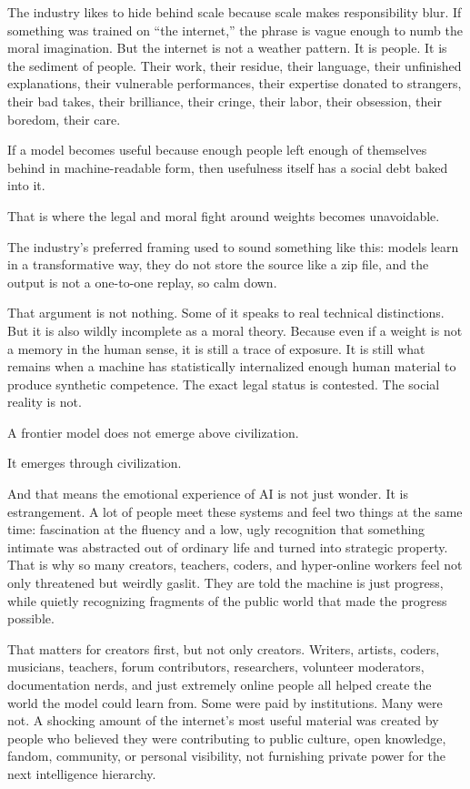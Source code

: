 \documentclass[
  american,
  12pt,
  letterpaper,
]{article}
\begin{document}
The industry likes to hide behind scale because scale makes
responsibility blur. If something was trained on ``the internet,'' the
phrase is vague enough to numb the moral imagination. But the internet
is not a weather pattern. It is people. It is the sediment of people.
Their work, their residue, their language, their unfinished
explanations, their vulnerable performances, their expertise donated to
strangers, their bad takes, their brilliance, their cringe, their labor,
their obsession, their boredom, their care.

If a model becomes useful because enough people left enough of
themselves behind in machine-readable form, then usefulness itself has a
social debt baked into it.

That is where the legal and moral fight around weights becomes
unavoidable.

The industry's preferred framing used to sound something like this:
models learn in a transformative way, they do not store the source like
a zip file, and the output is not a one-to-one replay, so calm down.

That argument is not nothing. Some of it speaks to real technical
distinctions. But it is also wildly incomplete as a moral theory.
Because even if a weight is not a memory in the human sense, it is still
a trace of exposure. It is still what remains when a machine has
statistically internalized enough human material to produce synthetic
competence. The exact legal status is contested. The social reality is
not.

A frontier model does not emerge above civilization.

It emerges through civilization.

And that means the emotional experience of AI is not just wonder. It is
estrangement. A lot of people meet these systems and feel two things at
the same time: fascination at the fluency and a low, ugly recognition
that something intimate was abstracted out of ordinary life and turned
into strategic property. That is why so many creators, teachers, coders,
and hyper-online workers feel not only threatened but weirdly gaslit.
They are told the machine is just progress, while quietly recognizing
fragments of the public world that made the progress possible.

That matters for creators first, but not only creators. Writers,
artists, coders, musicians, teachers, forum contributors, researchers,
volunteer moderators, documentation nerds, and just extremely online
people all helped create the world the model could learn from. Some were
paid by institutions. Many were not. A shocking amount of the internet's
most useful material was created by people who believed they were
contributing to public culture, open knowledge, fandom, community, or
personal visibility, not furnishing private power for the next
intelligence hierarchy.
\end{document}
